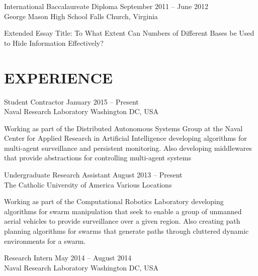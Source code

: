 \documentclass[line,margin]{cv}
\begin{document}
\begin{resume}
International Baccalaureate Diploma
\hfill September 2011 -- June 2012 \\
George Mason High School \hfill Falls Church, Virginia
\begin{adjustwidth}{2.5em}{2.5em}

    Extended Essay Title: To What Extent Can Numbers of Different Bases be Used
    to Hide Information Effectively?

\end{adjustwidth}

\section{EXPERIENCE}

Student Contractor
\hfill January 2015 -- Present \\
Naval Research Laboratory \hfill Washington DC, USA

\begin{adjustwidth}{2.5em}{2.5em}

    Working as part of the Distributed Autonomous Systems Group at the Naval
    Center for Applied Research in Artificial Intelligence developing
    algorithms for multi-agent surveillance and persistent monitoring. Also
    developing middlewares that provide abstractions for controlling
    multi-agent systems

\end{adjustwidth}

Undergraduate Research Assistant
\hfill August 2013 -- Present \\
The Catholic University of America \hfill Various Locations

\begin{adjustwidth}{2.5em}{2.5em}

    Working as part of the Computational Robotics Laboratory developing
    algorithms for swarm manipulation that seek to enable a group of unmanned
    aerial vehicles to provide surveillance over a given region. Also creating
    path planning algorithms for swarms that generate paths through cluttered
    dynamic environments for a swarm.

\end{adjustwidth}

Research Intern
\hfill May 2014 -- August 2014 \\
Naval Research Laboratory \hfill Washington DC, USA

\begin{adjustwidth}{2.5em}{2.5em}


\end{adjustwidth}
\end{resume}
\end{document}

